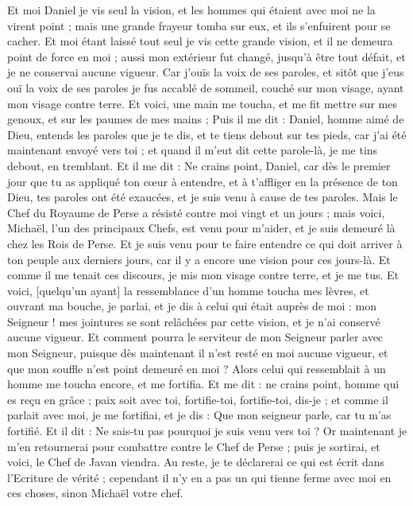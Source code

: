 \begin{multicols}{2}
Et moi Daniel je vis seul la vision, et les hommes qui étaient avec moi ne la virent point ; mais une grande frayeur tomba sur eux, et ils s'enfuirent pour se cacher.
Et moi étant laissé tout seul je vis cette grande vision, et il ne demeura point de force en moi ; aussi mon extérieur fut changé, jusqu'à être tout défait, et je ne conservai aucune vigueur.
Car j'ouïs la voix de ses paroles, et sitôt que j'eus ouï la voix de ses paroles je fus accablé de sommeil, couché sur mon visage, ayant mon visage contre terre.
Et voici, une main me toucha, et me fit mettre sur mes genoux, et sur les paumes de mes mains ;
Puis il me dit : Daniel, homme aimé de Dieu, entends les paroles que je te dis, et te tiens debout sur tes pieds, car j'ai été maintenant envoyé vers toi ; et quand il m'eut dit cette parole-là, je me tins debout, en tremblant.
Et il me dit : Ne crains point, Daniel, car dès le premier jour que tu as appliqué ton cœur à entendre, et à t'affliger en la présence de ton Dieu, tes paroles ont été exaucées, et je suis venu à cause de tes paroles.
Mais le Chef du Royaume de Perse a résisté contre moi vingt et un jours ; mais voici, Michaël, l'un des principaux Chefs, est venu pour m'aider, et je suis demeuré là chez les Rois de Perse.
Et je suis venu pour te faire entendre ce qui doit arriver à ton peuple aux derniers jours, car il y a encore une vision pour ces jours-là.
Et comme il me tenait ces discours, je mis mon visage contre terre, et je me tus.
Et voici, [quelqu'un ayant] la ressemblance d'un homme toucha mes lèvres, et ouvrant ma bouche, je parlai, et je dis à celui qui était auprès de moi : mon Seigneur ! mes jointures se sont relâchées par cette vision, et je n'ai conservé aucune vigueur.
Et comment pourra le serviteur de mon Seigneur parler avec mon Seigneur, puisque dès maintenant il n'est resté en moi aucune vigueur, et que mon souffle n'est point demeuré en moi ?
Alors celui qui ressemblait à un homme me toucha encore, et me fortifia.
Et me dit : ne crains point, homme qui es reçu en grâce ; paix soit avec toi, fortifie-toi, fortifie-toi, dis-je ; et comme il parlait avec moi, je me fortifiai, et je dis : Que mon seigneur parle, car tu m'as fortifié.
Et il dit : Ne sais-tu pas pourquoi je suis venu vers toi ? Or maintenant je m'en retournerai pour combattre contre le Chef de Perse ; puis je sortirai, et voici, le Chef de Javan viendra.
Au reste, je te déclarerai ce qui est écrit dans l'Ecriture de vérité ; cependant il n'y en a pas un qui tienne ferme avec moi en ces choses, sinon Michaël votre chef.

\end{multicols}
